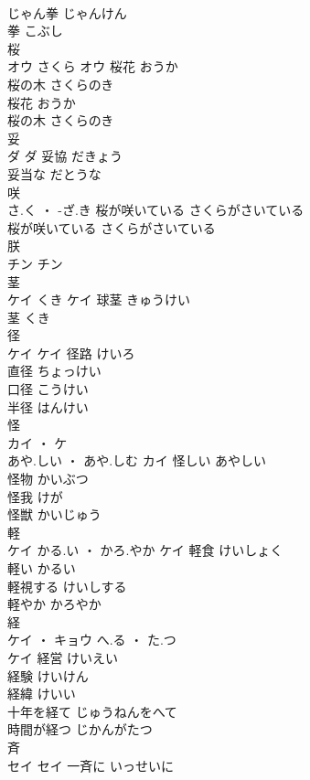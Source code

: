 \documentclass[8pt]{extreport}
\begin{document}
\begin{CJK}{UTF8}{min}
\\	じゃん拳	じゃんけん	
\\	拳	こぶし	
\\	桜	
\\	オウ	さくら	オウ	桜花	おうか	
\\	桜の木	さくらのき	
\\	桜花	おうか	
\\	桜の木	さくらのき	
\\	妥	
\\	ダ		ダ	妥協	だきょう	
\\	妥当な	だとうな	
\\	咲	
\\	さ.く ・ -ざ.き		桜が咲いている	さくらがさいている	
\\	桜が咲いている	さくらがさいている	
\\	朕	
\\	チン		チン																																			
\\	茎	
\\	ケイ	くき	ケイ	球茎	きゅうけい	
\\	茎	くき	
\\	径	
\\	ケイ		ケイ	径路	けいろ	
\\	直径	ちょっけい	
\\	口径	こうけい	
\\	半径	はんけい	
\\	怪	
\\	カイ ・ ケ
\\	あや.しい ・ あや.しむ	カイ	怪しい	あやしい	
\\	怪物	かいぶつ	
\\	怪我	けが	
\\	怪獣	かいじゅう	
\\	軽	
\\	ケイ	かる.い ・ かろ.やか	ケイ	軽食	けいしょく	
\\	軽い	かるい	
\\	軽視する	けいしする	
\\	軽やか	かろやか	
\\	経	
\\	ケイ ・ キョウ	へ.る ・ た.つ
\\	ケイ	経営	けいえい	
\\	経験	けいけん	
\\	経緯	けいい	
\\	十年を経て	じゅうねんをへて	
\\	時間が経つ	じかんがたつ	
\\	斉	
\\	セイ		セイ	一斉に	いっせいに	

\end{CJK}
\end{document}
